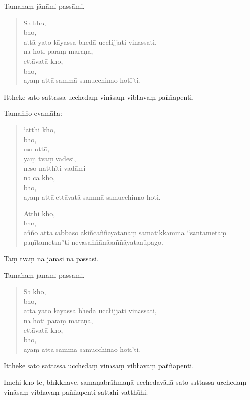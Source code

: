 \documentclass[11pt,twoside,openright]{book}
\begin{document}
\pstart
Tamahaṃ jānāmi passāmi.
\pend

\begin{verse}
So kho,\\
\vin  bho,\\
\vin  attā yato kāyassa bhedā ucchijjati vinassati,\\
\vin  na hoti paraṃ maraṇā,\\
\vin  ettāvatā kho,\\
\vin  bho,\\
\vin  ayaṃ attā sammā samucchinno hotī’ti.

\end{verse}
\pstart
Ittheke sato sattassa ucchedaṃ vināsaṃ vibhavaṃ paññapenti.
\pend

\pstart
Tamañño evamāha:
\pend

\begin{verse}
‘atthi kho,\\
\vin  bho,\\
\vin  eso attā,\\
\vin  yaṃ tvaṃ vadesi,\\
\vin  neso natthīti vadāmi\\


no ca kho,\\
\vin  bho,\\
\vin  ayaṃ attā ettāvatā sammā samucchinno hoti.

Atthi kho,\\
\vin  bho,\\
\vin  añño attā sabbaso ākiñcaññāyatanaṃ samatikkamma “santametaṃ paṇītametan”ti nevasaññānāsaññāyatanūpago.

\end{verse}
\pstart
Taṃ tvaṃ na jānāsi na passasi.
\pend

\pstart
Tamahaṃ jānāmi passāmi.
\pend

\begin{verse}
So kho,\\
\vin  bho,\\
\vin  attā yato kāyassa bhedā ucchijjati vinassati,\\
\vin  na hoti paraṃ maraṇā,\\
\vin  ettāvatā kho,\\
\vin  bho,\\
\vin  ayaṃ attā sammā samucchinno hotī’ti.

\end{verse}
\pstart
Ittheke sato sattassa ucchedaṃ vināsaṃ vibhavaṃ paññapenti.
\pend

\pstart
Imehi kho te, bhikkhave, samaṇabrāhmaṇā ucchedavādā sato sattassa ucchedaṃ vināsaṃ vibhavaṃ paññapenti sattahi vatthūhi.
\pend
\end{document}
